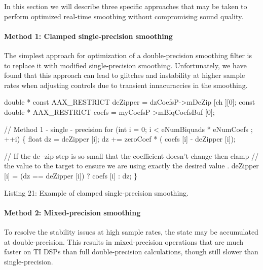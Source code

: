 In this section we will describe three specific approaches that may be taken to perform optimized real-\/time smoothing without compromising sound quality.

\hypertarget{a00362_subsubsection__method_1_clamped_singleprecision_smoothing_}{}\paragraph{Method 1\+: Clamped single-\/precision smoothing}\label{a00362_subsubsection__method_1_clamped_singleprecision_smoothing_}
 The simplest approach for optimization of a double-\/precision smoothing filter is to replace it with modified single-\/precision smoothing. Unfortunately, we have found that this approach can lead to glitches and instability at higher sample rates when adjusting controls due to transient innacuraccies in the smoothing.


\begin{DoxyCode}
\textcolor{keywordtype}{double} * \textcolor{keyword}{const} AAX\_RESTRICT deZipper = dzCoefsP->mDeZip [ch ][0];
\textcolor{keyword}{const} \textcolor{keywordtype}{double} * AAX\_RESTRICT coefs = myCoefsP->mBiqCoefsBuf [0];

\textcolor{comment}{// Method 1 - single - precision}
\textcolor{keywordflow}{for} (\textcolor{keywordtype}{int} i = 0; i < eNumBiquads * eNumCoefs ; ++i)
\{
    \textcolor{keywordtype}{float} dz = deZipper [i];
    dz += zeroCoef * ( coefs [i] - deZipper [i]);

    \textcolor{comment}{// If the de -zip step is so small that the coefficient doesn't change then clamp}
    \textcolor{comment}{// the value to the target to ensure we are using exactly the desired value .}
    deZipper [i] = (dz == deZipper [i]) ? coefs [i] : dz;
\} 
\end{DoxyCode}
  Listing 21\+: Example of clamped single-\/precision smoothing.

\hypertarget{a00362_subsubsection__method_2_mixedprecision_smoothing_}{}\paragraph{Method 2\+: Mixed-\/precision smoothing}\label{a00362_subsubsection__method_2_mixedprecision_smoothing_}
 To resolve the stability issues at high sample rates, the state may be accumulated at double-\/precision. This results in mixed-\/precision operations that are much faster on T\+I D\+S\+Ps than full double-\/precision calculations, though still slower than single-\/precision.


